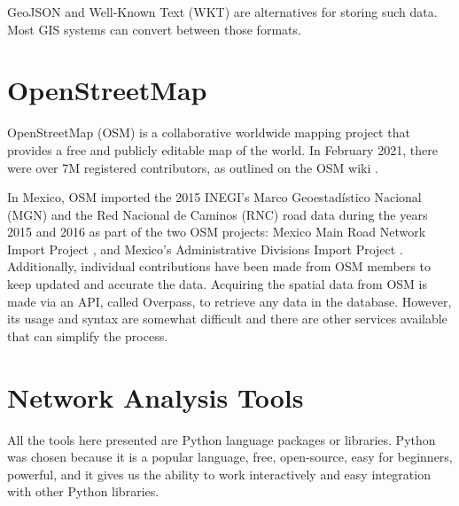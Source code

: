 GeoJSON and Well-Known Text (WKT) are alternatives for storing such data. Most GIS systems can convert between those formats.


\section{OpenStreetMap}



OpenStreetMap (OSM) is a collaborative worldwide mapping project that provides a free and publicly editable map of the world. In February 2021, there were over 7M registered contributors, as outlined on the OSM wiki \cite{osm-wiki}.

In Mexico, OSM imported the 2015 INEGI's Marco Geoestadístico Nacional (MGN) and the Red Nacional de Caminos (RNC) road data during the years 2015 and 2016 as part of the two OSM projects: Mexico Main Road Network Import Project \cite{osm_RNC_project}, and Mexico's Administrative Divisions Import Project \cite{osm_MGN_project}. Additionally, individual contributions have been made from OSM members to keep updated and accurate the data.
Acquiring the spatial data from OSM is made via an API, called Overpass, to retrieve any data in the database. However, its usage and syntax are somewhat difficult and there are other services available that can simplify the process.

\section{Network Analysis Tools}



All the tools here presented are Python language packages or libraries. Python was chosen because it is a popular language, free, open-source, easy for beginners, powerful, and it gives us the ability to work interactively and easy integration with other Python libraries.


